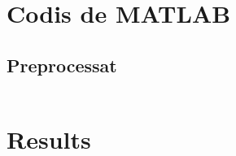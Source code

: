 
\section{Codis de MATLAB}

\subsection{Preprocessat}%
\label{app:pre}

\inputminted{matlab}{./code/P15601_en_Harrichu_y_and_the_maze.cc}

\section{Results}


